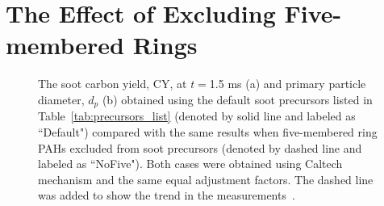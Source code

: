

\section{The Effect of Excluding Five-membered Rings}

\begin{figure}[H]
	\centering
	\caption{The soot carbon yield, CY, at $t=$1.5 ms (a) and primary particle diameter, $d_p$ (b) obtained using the default soot precursors listed in Table~\ref{tab:precursors_list} (denoted by solid line and labeled as ``Default") compared with the same results when five-membered ring PAHs  excluded from soot precursors (denoted by dashed line and labeled as ``NoFive"). Both cases were obtained using Caltech mechanism and the same equal adjustment factors. The dashed line was added to show the trend in the measurements~\citep{agafonov2016unified}.}
	\label{fig:shockagof_yieldspc_cpr} 
\end{figure}



